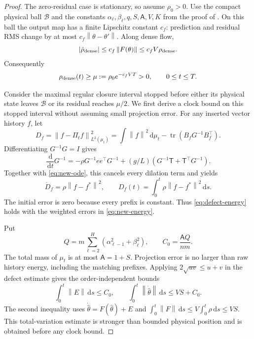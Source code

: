 \documentclass[11pt]{article}
\theoremstyle{definition}
\theoremstyle{remark}
\newcommand{\norm}[1]{\left\lVert #1\right\rVert}
\newcommand{\dd}{\,\mathrm{d}}
\begin{document}
\begin{proof}
The zero-residual case is stationary, so assume $\rho_0>0$.  Use the compact
physical ball $\mathcal B$ and the constants
$\alpha_\ell,\beta_\ell,q,S,\mathsf A,V,K$ from the proof of
.  On this ball the output map has a finite Lipschitz constant
$c_f$: prediction and residual RMS change by at most
$c_f\norm{\theta-\theta'}$.  Along dense flow,
\[
 |\dot\rho_{\rm dense}|\le c_f\norm{F(\theta)}
 \le c_fV\rho_{\rm dense}.
\]
Consequently
\begin{equation}
 \rho_{\rm dense}(t)\ge
 \mu:=\rho_0e^{-c_fVT}>0,\qquad 0\le t\le T.          \label{eq:dense-rho-lower}
\end{equation}

Consider the maximal regular closure interval stopped before either its
physical state leaves $\mathcal B$ or its residual reaches $\mu/2$.  We first
derive a clock bound on this stopped interval without assuming small
projection error.  For any inserted vector history $f$, let
\[
 D_f=\norm{f-\Pi_t f}_{L^2(\mu_t)}^2
 =\int\norm f^2\dd\mu_t-\operatorname{tr}(B_fG^{-1}B_f^\top).
\]
Differentiating $G^{-1}G=I$ gives
\[
 \frac{\dd}{\dd t}G^{-1}
 =-\rho G^{-1}ee^\top G^{-1}
 +(g/L)(G^{-1}\mathsf T+\mathsf T^\top G^{-1}).
\]
Together with \eqref{eq:new-ode}, this cancels every dilation term and yields
\begin{equation}
 \dot D_f=\rho\norm{f-f^*}^2,\qquad
 D_f(t)=\int_0^t\rho\norm{f-f^*}^2\dd s.             \label{eq:new-energy}
\end{equation}
The initial error is zero because every prefix is constant.  Thus
\eqref{eq:defect-energy} holds with the weighted errors in
\eqref{eq:new-energy}.

Put
\[
 Q=m\sum_{\ell=2}^H(\alpha_{\ell-1}^2+\beta_\ell^2),
 \qquad C_0=\frac{\mathsf A Q}{nm}.
\]
The total mass of $\mu_t$ is at most $\mathsf A=1+S$.  Projection error is no
larger than raw history energy, including the matching prefixes.  Applying
$2\sqrt{uv}\le u+v$ in the defect estimate gives the order-independent bounds
\begin{equation}
 \int_0^t\norm E\dd s\le C_0,\qquad
 \int_0^t\norm{\dot{\widehat\theta}}\dd s
 \le VS+C_0.                                         \label{eq:coarse-new}
\end{equation}
The second inequality uses
$\dot{\widehat\theta}=F(\widehat\theta)+E$ and
$\int_0^t\norm F\dd s\le V\int_0^t\rho\dd s\le VS$.
This total-variation estimate is stronger than bounded physical position and
is obtained before any clock bound.


\end{proof}
\end{document}
